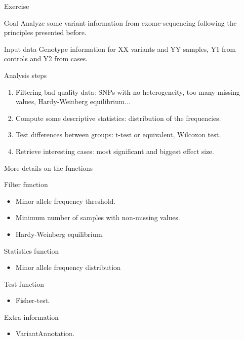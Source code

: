 \documentclass[10pt]{beamer}
\begin{document}
\begin{frame}{Exercise}
  \begin{block}{Goal}
    Analyze some variant information from exome-sequencing following the principles presented before.
  \end{block}
  \begin{block}{Input data}
    Genotype information for XX variants and YY samples, Y1 from controls and Y2 from cases.
  \end{block}
  \begin{block}{Analysis steps}
    \begin{enumerate}
    \item Filtering bad quality data: SNPs with no heterogeneity, too many missing values, Hardy-Weinberg equilibrium...
    \item Compute some descriptive statistics: distribution of the frequencies.
    \item Test differences between groups: t-test or equivalent, Wilcoxon test. 
    \item Retrieve interesting cases: most significant and biggest effect size.
    \end{enumerate}
  \end{block}
\end{frame}

\begin{frame}[label=justForUs]{More details on the functions}
  \begin{block}{Filter function}
    \begin{itemize}
    \item Minor allele frequency threshold.
    \item Minimum number of samples with non-missing values.
    \item Hardy-Weinberg equilibrium.
    \end{itemize}
  \end{block}
  \begin{block}{Statistics function}
    \begin{itemize}
    \item Minor allele frequency distribution
    \end{itemize}
  \end{block}
  \begin{block}{Test function}
    \begin{itemize}
    \item Fisher-test.
    \end{itemize}
  \end{block}
  \begin{block}{Extra information}
    \begin{itemize}
    \item VariantAnnotation.
    \end{itemize}
  \end{block}
\end{frame}
\end{document}
